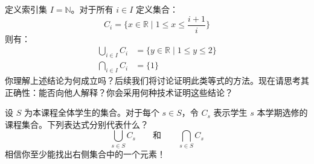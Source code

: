 \begin{example}
    定义索引集 $I = \mathbb{N}$。对于所有 $i \in I$ 定义集合：
    \[C_i = \Bigg\{x \in \mathbb{R} \mid 1 \le x \le \frac{i + 1}{i}\Bigg\}\]
    则有：
    \begin{align*}
        \bigcup_{i \in I} C_i &= \{y \in \mathbb{R} \mid 1 \le y \le 2\} \\
        \bigcap_{i \in I} C_i &= \{1\}
    \end{align*}
    你理解上述结论为何成立吗？后续我们将讨论证明此类等式的方法。现在请思考其正确性：能否向他人解释？你会采用何种技术证明这些结论？
\end{example}

\begin{example}
    设 $S$ 为本课程全体学生的集合。对于每个 $s \in S$，令 $C_s$ 表示学生 $s$ 本学期选修的课程集合。下列表达式分别代表什么？
    \[\bigcup_{s \in S} C_s \qquad\text{和}\qquad \bigcap_{s \in S} C_s\]
    相信你至少能找出右侧集合中的一个元素！
\end{example}
